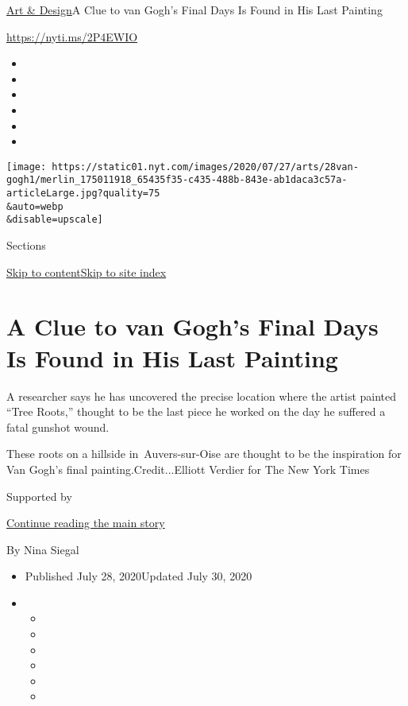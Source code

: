 \href{/section/arts/design}{Art \& Design}\textbar{}A Clue to van Gogh's
Final Days Is Found in His Last Painting

\url{https://nyti.ms/2P4EWIO}

\begin{itemize}
\item
\item
\item
\item
\item
\item
\end{itemize}

\texttt{[image: https://static01.nyt.com/images/2020/07/27/arts/28van-gogh1/merlin\_175011918\_65435f35-c435-488b-843e-ab1daca3c57a-articleLarge.jpg?quality=75\\\&auto=webp\\\&disable=upscale]}

Sections

\protect\hyperlink{site-content}{Skip to
content}\protect\hyperlink{site-index}{Skip to site index}

\hypertarget{a-clue-to-van-goghs-final-days-is-found-in-his-last-painting}{%
\section{A Clue to van Gogh's Final Days Is Found in His Last
Painting}\label{a-clue-to-van-goghs-final-days-is-found-in-his-last-painting}}

A researcher says he has uncovered the precise location where the artist
painted ``Tree Roots,'' thought to be the last piece he worked on the
day he suffered a fatal gunshot wound.

These roots on a hillside in~Auvers-sur-Oise are thought to be the
inspiration for Van Gogh's final painting.Credit...Elliott Verdier for
The New York Times

Supported by

\protect\hyperlink{after-sponsor}{Continue reading the main story}

By Nina Siegal

\begin{itemize}
\item
  Published July 28, 2020Updated July 30, 2020
\item
  \begin{itemize}
  \item
  \item
  \item
  \item
  \item
  \item
  \end{itemize}
\end{itemize}

